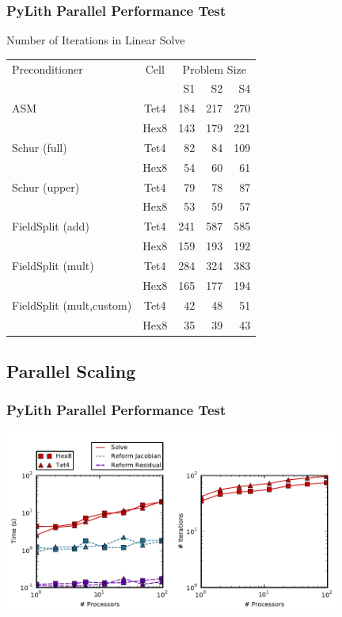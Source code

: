 \documentclass{beamer}
\newcommand{\important}[1]{{\color{red}#1}}
\begin{document}
\begin{frame}
  \frametitle{PyLith Parallel Performance Test}

  \begin{center}
    Number of Iterations in Linear Solve\\[4pt]
\begin{tabular}{lcrrr}
  \hline
  Preconditioner & Cell & \multicolumn{3}{c}{Problem Size} \\
     &      & S1 & S2 & S4 \\
  \hline
  ASM
    & Tet4 & 184 & 217 & 270 \\
    & Hex8 & 143 & 179 & 221 \\
  Schur (full)
    & Tet4 & 82 & 84 & 109 \\
    & Hex8 & 54 & 60 & 61 \\
  Schur (upper)
    & Tet4 & 79 & 78 & 87 \\
    & Hex8 & 53 & 59 & 57 \\
  FieldSplit (add)
    & Tet4 & 241 & 587 & 585 \\
    & Hex8 & 159 & 193 & 192 \\
  FieldSplit (mult)
    & Tet4 & 284 & 324 & 383 \\
    & Hex8 & 165 & 177 & 194 \\
  \important{FieldSplit (mult,custom)}
    & Tet4 & 42 & 48 & 51 \\
    & Hex8 & 35 & 39 & 43 \\
\hline
\end{tabular}
  \end{center}
  
\end{frame}


\subsection{Parallel Scaling}

\begin{frame}
  \frametitle{PyLith Parallel Performance Test}

  \begin{center}
    \includegraphics[width=11.0cm]{figs/solvertest_scaling}
  \end{center}
  
\end{frame}
\end{document}
